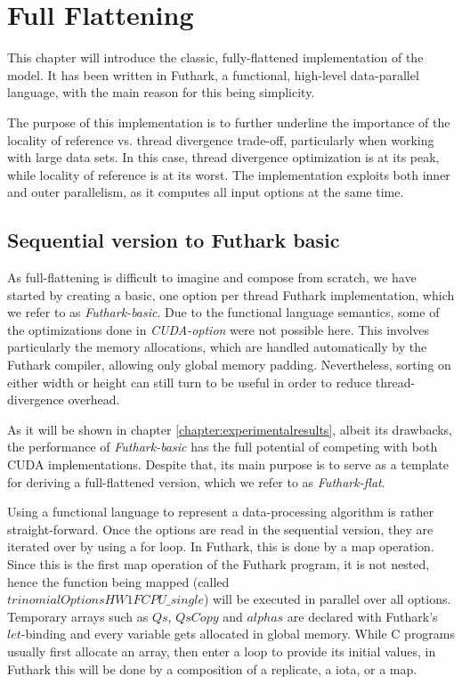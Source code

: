 \chapter{Full Flattening}
\label{chapter:fullflattening}
This chapter will introduce the classic, fully-flattened implementation of the model. It has been written in Futhark, a functional, high-level data-parallel language, with the main reason for this being simplicity. 

The purpose of this implementation is to further underline the importance of the locality of reference vs. thread divergence trade-off, particularly when working with large data sets. In this case, thread divergence optimization is at its peak, while locality of reference is at its worst. The implementation exploits both inner and outer parallelism, as it computes all input options at the same time. 

\section{Sequential version to Futhark basic}
As full-flattening is difficult to imagine and compose from scratch, we have started by creating a basic, one option per thread Futhark implementation, which we refer to as \textit{Futhark-basic}. Due to the functional language semantics, some of the optimizations done in \textit{CUDA-option} were not possible here. This involves particularly the memory allocations, which are handled automatically by the Futhark compiler, allowing only global memory padding. Nevertheless, sorting on either width or height can still turn to be useful in order to reduce thread-divergence overhead. 

As it will be shown in chapter \ref{chapter:experimentalresults}, albeit its drawbacks, the performance of \textit{Futhark-basic} has the full potential of competing with both CUDA implementations. Despite that, its main purpose is to serve as a template for deriving a full-flattened version, which we refer to as \textit{Futhark-flat}.

Using a functional language to represent a data-processing algorithm is rather straight-forward. Once the options are read in the sequential version, they are iterated over by using a for loop. In Futhark, this is done by a map operation. Since this is the first map operation of the Futhark program, it is not nested, hence the function being mapped (called\\ $\mathit{trinomialOptionsHW1FCPU\_single}$) will be executed in parallel over all options. Temporary arrays such as $\mathit{Qs}$, $\mathit{QsCopy}$ and $\mathit{alphas}$ are declared with Futhark's $\mathit{let}$-binding and every variable gets allocated in global memory. While C programs usually first allocate an array, then enter a loop to provide its initial values, in Futhark this will be done by a composition of a replicate, a iota, or a map.

